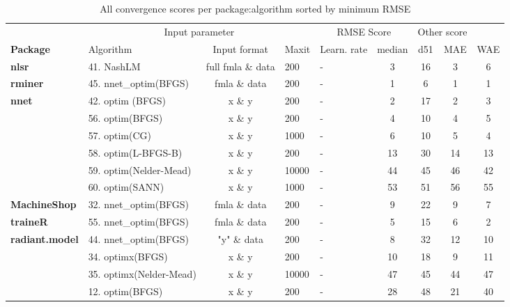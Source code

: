\begin{Schunk}
\begin{table}

\caption{\label{tab:unnamed-chunk-9}All convergence scores per package:algorithm sorted by minimum RMSE}
\centering
\fontsize{7}{9}\selectfont
\begin{tabular}[t]{>{\bfseries}llcllcccc}
\toprule
\multicolumn{2}{c}{ } & \multicolumn{3}{c}{Input parameter} & \multicolumn{2}{c}{RMSE Score} & \multicolumn{2}{c}{Other score} \\
\cmidrule(l{3pt}r{3pt}){3-5} \cmidrule(l{3pt}r{3pt}){6-7} \cmidrule(l{3pt}r{3pt}){8-9}
Package & Algorithm & Input format & Maxit & Learn. rate & median & d51 & MAE & WAE\\
\midrule
nlsr & 41. NashLM & full fmla \& data & 200 & - & 3 & 16 & 3 & 6\\
\cmidrule{1-9}
rminer & 45. nnet\_optim(BFGS) & fmla \& data & 200 & - & 1 & 6 & 1 & 1\\
\cmidrule{1-9}
nnet & 42. optim (BFGS) & x \& y & 200 & - & 2 & 17 & 2 & 3\\
\cmidrule{1-9}
 & 56. optim(BFGS) & x \& y & 200 & - & 4 & 10 & 4 & 5\\

 & 57. optim(CG) & x \& y & 1000 & - & 6 & 10 & 5 & 4\\

 & 58. optim(L-BFGS-B) & x \& y & 200 & - & 13 & 30 & 14 & 13\\

 & 59. optim(Nelder-Mead) & x \& y & 10000 & - & 44 & 45 & 46 & 42\\

\multirow{-5}{*}{\raggedright\arraybackslash validann} & 60. optim(SANN) & x \& y & 1000 & - & 53 & 51 & 56 & 55\\
\cmidrule{1-9}
MachineShop & 32. nnet\_optim(BFGS) & fmla \& data & 200 & - & 9 & 22 & 9 & 7\\
\cmidrule{1-9}
traineR & 55. nnet\_optim(BFGS) & fmla \& data & 200 & - & 5 & 15 & 6 & 2\\
\cmidrule{1-9}
radiant.model & 44. nnet\_optim(BFGS) & "y" \& data & 200 & - & 8 & 32 & 12 & 10\\
\cmidrule{1-9}
 & 34. optimx(BFGS) & x \& y & 200 & - & 10 & 18 & 9 & 11\\

\multirow{-2}{*}{\raggedright\arraybackslash monmlp} & 35. optimx(Nelder-Mead) & x \& y & 10000 & - & 47 & 45 & 44 & 47\\
\cmidrule{1-9}
 & 12. optim(BFGS) & x \& y & 200 & - & 28 & 48 & 21 & 40\\


\end{tabular}
\end{table}
\end{Schunk}
